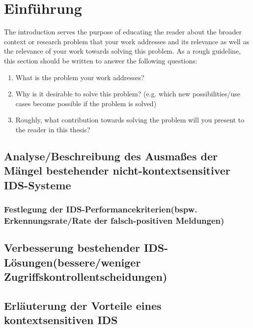
\chapter{Einführung}
\label{cha:introduction}

The introduction serves the purpose of educating the reader about the broader context or research problem that your work addresses and its relevance as well as the relevance of your work towards solving this problem.
As a rough guideline, this section should be written to answer the following questions:
\begin{enumerate}
   \item What is the problem your work addresses?
   \item Why is it desirable to solve this problem? (e.g. which new possibilities/use cases become possible if the problem is solved)
   \item Roughly, what contribution towards solving the problem will you present to the reader in this thesis?
\end{enumerate}
\section{Analyse/Beschreibung des Ausmaßes der Mängel bestehender nicht-kontextsensitiver IDS-Systeme}
\subsection{Festlegung der IDS-Performancekriterien(bspw. Erkennungsrate/Rate der falsch-positiven Meldungen)} 
\section{Verbesserung bestehender IDS-Lösungen(bessere/weniger Zugriffskontrollentscheidungen)}   



\section{Erläuterung der Vorteile eines kontextsensitiven IDS}

